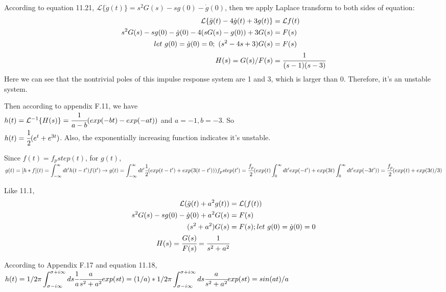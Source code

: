 \documentclass[12pt,a4paper]{article}
\begin{document}
According to equation 11.21, $\mathcal{L}\{\ddot{g}(t)\}=s^2G(s)-sg(0)-\dot{g}(0)$, then we apply Laplace transform to both sides of equation:\\
\vspace{-1cm}
\begin{align*}
  \mathcal{L}\{\ddot{g}(t)-4\dot{g}(t)+3g(t)\} &=\mathcal{L}f(t)\\
  s^2G(s)-sg(0)-\dot{g}(0)-4(sG(s)-g(0))+3G(s)&=F(s) \\
  let\ g(0)=\dot{g}(0)=0;\ (s^2-4s+3)G(s)&=F(s) \\
  H(s)=G(s)/F(s)&=\cfrac{1}{(s-1)(s-3)}
\end{align*}
Here we can see that the nontrivial poles of this impulse response system are 1 and 3, which is larger than 0. Therefore, it's an unstable system. 

Then according to appendix F.11, we have \\
$h(t)=\mathcal{L}^{-1}\{H(s)\}=\cfrac{1}{a-b}(exp(-bt)-exp(-at))$ and $a=-1,b=-3$. So \\
$h(t)=\cfrac{1}{2}(e^t+e^{3t})$. Also, the exponentially increasing function indicates it's unstable. 

Since $f(t)=f_p step(t)$, for $g(t)$, $g(t)=[h*f](t)=\infint dt' h(t-t')f(t') \rightarrow\\
g(t)=\infint dt' \cfrac{1}{2} (exp(t-t')+exp(3(t-t'))) f_p step(t')\\
=\cfrac{f_p}{2}(exp(t)\bint{0}{\infty} dt' exp(-t')+exp(3t)\bint{0}{\infty} dt' exp(-3t'))\\
=\cfrac{f_p}{2}(exp(t)+exp(3t)/3)$

\newpage
{}
Like 11.1, \\
\vspace{-1cm}
\begin{align*}
    \mathcal{L}(\ddot{g}(t)+a^2g(t)) &= \mathcal{L}(f(t)) \\
    s^2 G(s)-sg(0)-\dot{g}(0)+a^2G(s) &= F(s) \\
    (s^2+a^2)G(s) &= F(s); let\ g(0)=\dot{g}(0)=0 \\
    H(s)=\cfrac{G(s)}{F(s)}=\cfrac{1}{s^2+a^2}
\end{align*}

According to Appendix F.17 and equation 11.18, \\
$h(t)=1/2\pi \bint{\sigma-i\infty}{\sigma+i\infty} ds \cfrac{1}{a}\cfrac{a}{s^2+a^2}exp(st)\\
=(1/a)*1/2\pi \bint{\sigma-i\infty}{\sigma+i\infty} ds \cfrac{a}{s^2+a^2}exp(st)\\
=sin(at)/a$
\end{document}
